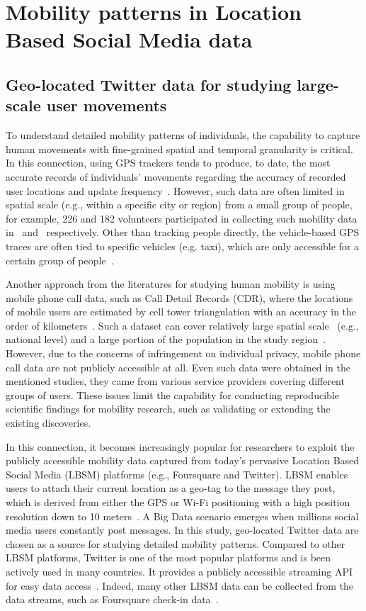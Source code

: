 \documentclass[ijgi,article,accept,moreauthors,pdftex,10pt,a4paper]{mdpi}
\theoremstyle{mdpi}
\newcounter{ex}
\newcounter{re}
\theoremstyle{mdpidefinition}
\begin{document}
\section{Mobility patterns in Location Based Social Media data}
\subsection{Geo-located Twitter data for studying large-scale user movements}
To understand detailed mobility patterns of individuals, the capability to capture human movements with fine-grained spatial and temporal granularity is critical.
In this connection, using GPS trackers tends to produce, to date, the most accurate records of individuals' movements regarding the accuracy of recorded user locations and update frequency~\cite{zheng2008understanding}.
However, such data are often limited in spatial scale (e.g., within a specific city or region) from a small group of people, for example, 226 and 182 volunteers participated in collecting such mobility data in~\cite{rhee2011levy} and~\cite{zheng2010geolife} respectively.
Other than tracking people directly, the vehicle-based GPS traces are often tied to specific vehicles (e.g. taxi), which are only accessible for a certain group of people~\cite{kung2014exploring}. 

Another approach from the literatures for studying human mobility is using mobile phone call data, such as Call Detail Records (CDR), where the locations of mobile users are estimated by cell tower triangulation with an accuracy in the order of kilometers~\cite{gonzalez2008understanding,sevtsuk2010does,kung2014exploring}.
Such a dataset can cover relatively large spatial scale~\cite{becker2013human,sobolevsky2013delineating} (e.g., national level) and a large portion of the population in the study region~\cite{kung2014exploring}.
However, due to the concerns of infringement on individual privacy, mobile phone call data are not publicly accessible at all.
Even such data were obtained in the mentioned studies, they came from various service providers covering different groups of users.
These issues limit the capability for conducting reproducible scientific findings for mobility research, such as validating or extending the existing discoveries.

In this connection, it becomes increasingly popular for researchers to exploit the publicly accessible mobility data captured from today's pervasive Location Based Social Media (LBSM) platforms (e.g., Foursquare and Twitter).
LBSM enables users to attach their current location as a geo-tag to the message they post, which is derived from either the GPS or Wi-Fi positioning with a high position resolution down to 10 meters~\cite{Jurdak2015}.
A Big Data scenario emerges when millions social media users constantly post messages.
In this study, geo-located Twitter data are chosen as a source for studying detailed mobility patterns.
Compared to other LBSM platforms, Twitter is one of the most popular platforms and is been actively used in many countries.
It provides a publicly accessible streaming API for easy data access~\cite{twitterAPI}.
Indeed, many other LBSM data can be collected from the data streams, such as Foursquare check-in data~\cite{cranshaw2012livehoods,hasan2013understanding}.
\end{document}
